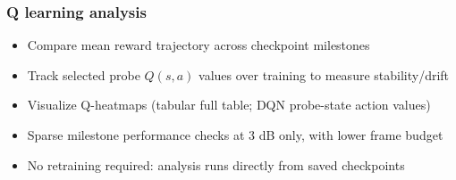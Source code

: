 \documentclass{beamer}
\begin{document}
\begin{frame}
\frametitle{Q learning analysis}

\begin{itemize}
    \item Compare mean reward trajectory across checkpoint milestones
    \item Track selected probe $Q(s,a)$ values over training to measure stability/drift
    \item Visualize Q-heatmaps (tabular full table; DQN probe-state action values)
    \item Sparse milestone performance checks at 3 dB only, with lower frame budget
    \item No retraining required: analysis runs directly from saved checkpoints
\end{itemize}

\end{frame}

\end{document}
